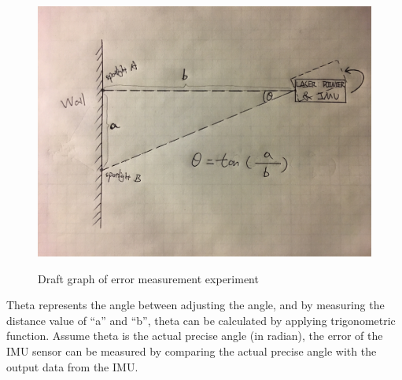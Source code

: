 \begin{figure}
	\centering
 		\caption{Draft graph of error measurement experiment}
      	\includegraphics[width=\textwidth,height=\textheight,keepaspectratio]{img/draft}
    \label{fig:draft}
\end{figure}

Theta represents the angle between adjusting the angle, and by measuring the distance value of “a” and “b”, theta can be calculated by applying trigonometric function. Assume theta is the actual precise angle (in radian), the error of the IMU sensor can be measured by comparing the actual precise angle with the output data from the IMU.






